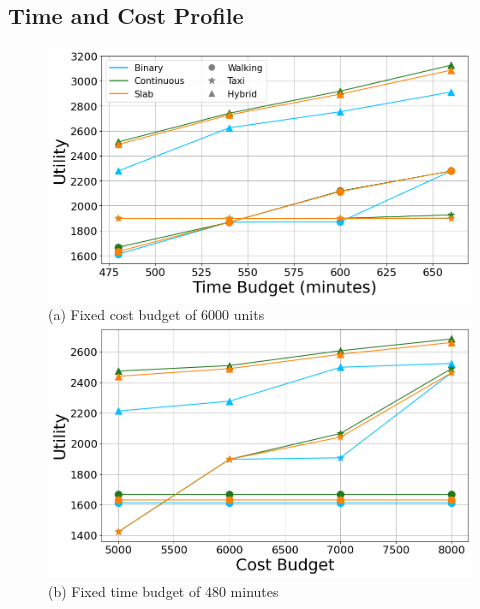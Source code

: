 \subsection{Time and Cost Profile}

\begin{figure}[t]
\centering
\includegraphics[width=\figwidth]{plots/multimodality1.png} \\
(a) Fixed cost budget of 6000 units 
\includegraphics[width=\figwidth]{plots/multimodality2.png} \\
(b) Fixed time budget of 480 minutes
\label{fig:multi-modal}
\end{figure}

